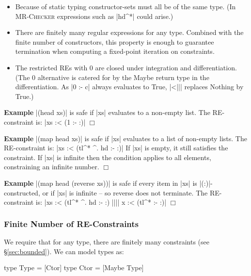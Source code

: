 \documentclass[preprint]{sigplanconf}
\newcommand{\C}[1]{\textsf{#1}}
\newcommand{\catch}{\textsc{Catch}}
\newcommand{\oldtool}{\anon{\catch05}{\textsc{MR-Checker}}}
\newcounter{exmp}
\newcommand{\yesexample}{\addtocounter{exmp}{1}\addvspace{2mm}\noindent\textbf{Example \arabic{exmp}}}
\newcommand{\noexample}{\hfill\ensuremath{\Box}\par\addvspace{2mm}}
\newcommand{\anon}[2]{#2}
\newenvironment{example}{\yesexample}{\noexample}
\begin{document}
\begin{itemize}
\item Because of static typing constructor-sets must all be of the same type. (In \oldtool{} expressions such as |hd^*| could arise.)

\item There are finitely many regular expressions for any type. Combined with the finite number of constructors, this property is enough to guarantee termination when computing a fixed-point iteration on constraints.

\item The restricted REs with 0 are closed under integration and differentiation. (The 0 alternative is catered for by the \C{Maybe} return type in the differentiation. As |0 :- c| always evaluates to True, |<||| replaces \C{Nothing} by True.)
\end{itemize}

\begin{example}
|(head xs)| is safe if |xs| evaluates to a non-empty list. The RE-constraint is: |xs :< (1 :- {:})|
\end{example}

\begin{example}
|(map head xs)| is safe if |xs| evaluates to a list of non-empty lists. The RE-constraint is: |xs :< (tl^* ^. hd :- {:})| If |xs| is empty, it still satisfies the constraint. If |xs| is infinite then the condition applies to all elements, constraining an infinite number.
\end{example}

\begin{example}
|(map head (reverse xs))| is safe if every item in |xs| is |(:)|-constructed, or if |xs| is infinite -- so \C{reverse} does not terminate. The RE-constraint is: |xs :< (tl^* ^. hd :- {:}) |||| x :< (tl^* :- {:})|
\end{example}

\subsubsection{Finite Number of RE-Constraints}
\label{sec:finite_re}

We require that for any type, there are finitely many constraints (see \S\ref{sec:bounded}). We can model types as:

\begin{code}
type Type  = [Ctor]
type Ctor  = [Maybe Type]
\end{code}
\end{document}
